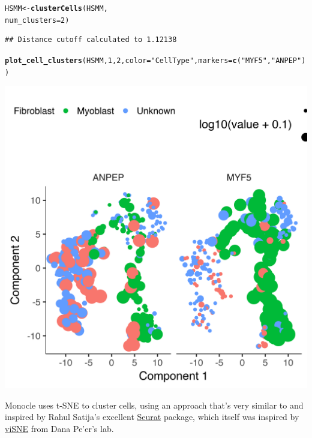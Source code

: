 \documentclass[10pt,oneside]{article}\usepackage[]{graphicx}\usepackage[]{color}
\makeatletter
\def\maxwidth{ %
  \ifdim\Gin@nat@width>\linewidth
    \linewidth
  \else
    \Gin@nat@width
  \fi
}
\newcommand{\hlnum}[1]{\textcolor[rgb]{0.686,0.059,0.569}{#1}}%
\newcommand{\hlstr}[1]{\textcolor[rgb]{0.192,0.494,0.8}{#1}}%
\newcommand{\hlstd}[1]{\textcolor[rgb]{0.345,0.345,0.345}{#1}}%
\newcommand{\hlkwb}[1]{\textcolor[rgb]{0.69,0.353,0.396}{#1}}%
\newcommand{\hlkwc}[1]{\textcolor[rgb]{0.333,0.667,0.333}{#1}}%
\newcommand{\hlkwd}[1]{\textcolor[rgb]{0.737,0.353,0.396}{\textbf{#1}}}%
\newenvironment{kframe}{%
 \def\at@end@of@kframe{}%
 \ifinner\ifhmode%
  \def\at@end@of@kframe{\end{minipage}}%
  \begin{minipage}{\columnwidth}%
 \fi\fi%
 \def\FrameCommand##1{\hskip\@totalleftmargin \hskip-\fboxsep
 \colorbox{shadecolor}{##1}\hskip-\fboxsep
     \hskip-\linewidth \hskip-\@totalleftmargin \hskip\columnwidth}%
 \MakeFramed {\advance\hsize-\width
   \@totalleftmargin\z@ \linewidth\hsize
   \@setminipage}}%
 {\par\unskip\endMakeFramed%
 \at@end@of@kframe}
\newenvironment{knitrout}{}{} %
\makeatother
\begin{document}
\begin{knitrout}
\begin{kframe}
{\ttfamily\noindent\itshape\color{messagecolor}{\#\# Reduce dimension by tSNE ...}}\begin{alltt}
\hlstd{HSMM} \hlkwb{<-} \hlkwd{clusterCells}\hlstd{(HSMM,}
                     \hlkwc{num_clusters}\hlstd{=}\hlnum{2}\hlstd{)}
\end{alltt}
\begin{verbatim}
## Distance cutoff calculated to 1.12138
\end{verbatim}


{\ttfamily\noindent\itshape\color{messagecolor}{\#\# the length of the distance: 34191}}\begin{alltt}
\hlkwd{plot_cell_clusters}\hlstd{(HSMM,} \hlnum{1}\hlstd{,} \hlnum{2}\hlstd{,} \hlkwc{color}\hlstd{=}\hlstr{"CellType"}\hlstd{,} \hlkwc{markers}\hlstd{=}\hlkwd{c}\hlstd{(}\hlstr{"MYF5"}\hlstd{,} \hlstr{"ANPEP"}\hlstd{))}
\end{alltt}
\end{kframe}

{\centering \includegraphics[width=\maxwidth]{figure/cluster_cells_unsup_no_covariate-2} 

}



\end{knitrout}

Monocle uses t-SNE \cite{Maaten2008-om} to cluster cells, using an approach that's very similar to and inspired by Rahul Satija's excellent \href{http://satijalab.org/seurat/}{Seurat} package, which itself was inspired by \href{https://www.c2b2.columbia.edu/danapeerlab/html/cyt.html}{viSNE} from Dana Pe'er's lab.
\end{document}
